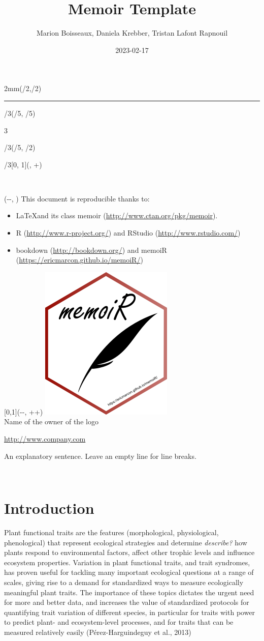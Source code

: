 \documentclass[
  12pt,
  american,
  a4paper,
  extrafontsizes,onecolumn,openright
  ]{memoir}
\title{Memoir Template}
\author{Marion Boisseaux, Daniela Krebber, Tristan Lafont Rapnouil}
\date{2023-02-17}
\makeatletter
\newcommand{\MemoirChapStyle}{daleif1}
\newcommand{\MemoirPageStyle}{Ruled}
\newlength\widthw %
\newcommand*{\SmallMargins}{
  \setlrmarginsandblock{1.5in}{1.5in}{*}
  \setmarginnotes{0.1in}{0.1in}{0.1in}
 \setulmarginsandblock{1.5in}{1in}{*}
  \checkandfixthelayout
  \ch@ngetext
  \clearpage
  \setlength{\widthw}{\textwidth+\marginparsep+\marginparwidth}
  \footnotesatfoot
  \chapterstyle{\MemoirChapStyle}  %
  \pagestyle{\MemoirPageStyle}
}
\newcommand{\LargeMargins}{\SmallMargins}
\newcommand{\MainTitlePage}[2]{
  \SmallMargins %
  \pagestyle{empty} %
  \textblockorigin{\stockwidth-\paperwidth-\trimedge}{\trimtop} %
  \begin{textblock*}{2mm}(\spinemargin/2,\uppermargin/2)
    \rule{1pt}{\paperheight-\uppermargin}
  \end{textblock*}
  \begin{textblock*}{\paperwidth*2/3}(\paperwidth/5, \paperheight/5)
    \flushright
    \begin{Spacing}{3}
      {\fontfamily{qtm}\selectfont\fontsize{45}{45}\selectfont\textsc{\thetitle}}
    \end{Spacing}
  \end{textblock*}
    \begin{textblock*}{\paperwidth*2/3}(\paperwidth/5, \paperheight/2)
    \flushright
    {\fontfamily{qtm}\huge\theauthor}
  \end{textblock*}
    \begin{textblock*}{\paperwidth*2/3}[0, 1](\spinemargin, \uppermargin+\textheight)
    \normalfont\thedate
  \end{textblock*}
  ~\\ %
  \newpage
  \textblockorigin{\trimedge}{\trimtop} %
  \begin{textblock*}{\textwidth}(\paperwidth-\spinemargin-\textwidth, \uppermargin)
    #1
  \end{textblock*}
  \begin{textblock*}{\textwidth}[0,1](\paperwidth-\spinemargin-\textwidth, \uppermargin+\textheight+\footskip)
    \centering
    \includegraphics[width=\paperwidth/4]{logo}\\ \bigskip
    #2
  \end{textblock*}
  ~\\ %
  \newpage
}
\makeatother
\begin{document}
\frontmatter



\cleardoublepage

\MainTitlePage{This document is reproducible thanks to:

\begin{itemize}
  \item \LaTeX and its class memoir (\url{http://www.ctan.org/pkg/memoir}).
  \item R (\url{http://www.r-project.org/}) and RStudio (\url{http://www.rstudio.com/})
  \item bookdown (\url{http://bookdown.org/}) and memoiR (\url{https://ericmarcon.github.io/memoiR/})
\end{itemize}}{Name of the owner of the logo

\url{http://www.company.com}

An explanatory sentence.
Leave an empty line for line breaks.}








\LargeMargins
{
\hypersetup{linkcolor=}
\setcounter{tocdepth}{2}
\tableofcontents
}



\LargeMargins
\hypertarget{intro}{%
\chapter{Introduction}\label{intro}}

Plant functional traits are the features (morphological, physiological, phenological) that represent ecological strategies and determine \emph{describe?} how plants respond to environmental factors, affect other trophic levels and influence ecosystem properties.
Variation in plant functional traits, and trait syndromes, has proven useful for tackling many important ecological questions at a range of scales, giving rise to a demand for standardized ways to measure ecologically meaningful plant traits.
The importance of these topics dictates the urgent need for more and better data, and increases the value of standardized protocols for quantifying trait variation of different species, in particular for traits with power to predict plant- and ecosystem-level processes, and for traits that can be measured relatively easily (Pérez-Harguindeguy et al., 2013)
\end{document}
